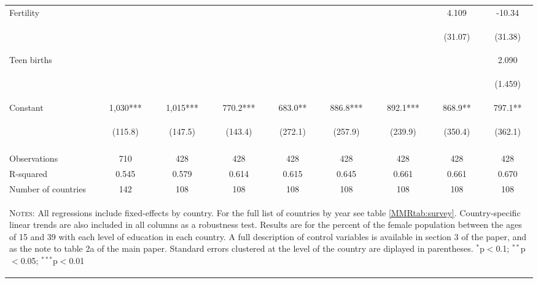 \begin{landscape}
\begin{table}[htpb!]
\begin{center}
\begin{tabular}{lcccccccc}
Fertility&&&&&&&4.109&-10.34\\
&&&&&&&\begin{footnotesize}(31.07)\end{footnotesize}&\begin{footnotesize}(31.38)\end{footnotesize}\\
Teen births&&&&&&&&2.090\\
&&&&&&&&\begin{footnotesize}(1.459)\end{footnotesize}\\
Constant&1,030***&1,015***&770.2***&683.0**&886.8***&892.1***&868.9**&797.1**\\
&\begin{footnotesize}(115.8)\end{footnotesize}&\begin{footnotesize}(147.5)\end{footnotesize}&\begin{footnotesize}(143.4)\end{footnotesize}&\begin{footnotesize}(272.1)\end{footnotesize}&\begin{footnotesize}(257.9)\end{footnotesize}&\begin{footnotesize}(239.9)\end{footnotesize}&\begin{footnotesize}(350.4)\end{footnotesize}&\begin{footnotesize}(362.1)\end{footnotesize}\\
&&&&&&&&\\
Observations&710&428&428&428&428&428&428&428\\
R-squared&0.545&0.579&0.614&0.615&0.645&0.661&0.661&0.670\\
Number of countries&142&108&108&108&108&108&108&108\\
\midrule
\multicolumn{9}{p{20cm}}{\begin{footnotesize}\textsc{Notes:} All regressions include fixed-effects by country. For the full list of countries by year see table \ref{MMRtab:survey}. Country-specific linear trends are also included in all columns as a  robustness test. Results are for the percent of the female population between the ages of 15 and 39 with each level of education in each country.  A full description of control variables is available in section 3 of the paper, and as the note to table 2a of the main paper.  Standard errors clustered at the  level of the country are diplayed in parentheses.
$^{*}$p$<$0.1; $^{**}$p$<$0.05; $^{***}$p$<$0.01\end{footnotesize}} \\ \bottomrule 
\end{tabular}\end{center}\end{table}\end{landscape}
